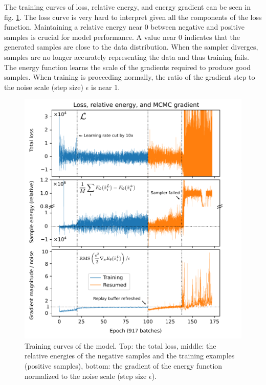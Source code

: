 The training curves of loss, relative energy, and energy gradient can be seen in fig. \ref{fig:losses-energies}. The loss curve is very hard to interpret given all the components of the loss function. Maintaining a relative energy near 0 between negative and positive samples is crucial for model performance. A value near 0 indicates that the generated samples are close to the data distribution. When the sampler diverges, samples are no longer accurately representing the data and thus training fails. The energy function learns the scale of the gradients required to produce good samples. When training is proceeding normally, the ratio of the gradient step to the noise scale (step size) $\epsilon$ is near 1. 

\begin{figure}
	\centering
	\includegraphics[width=\linewidth]{figures/losses-energies.pdf}
	\caption[EBM training curves]{\label{fig:losses-energies}Training curves of the model. Top: the total loss, middle: the relative energies of the negative samples and the training examples (positive samples), bottom: the gradient of the energy function normalized to the noise scale (step size $\epsilon$).}
\end{figure}

